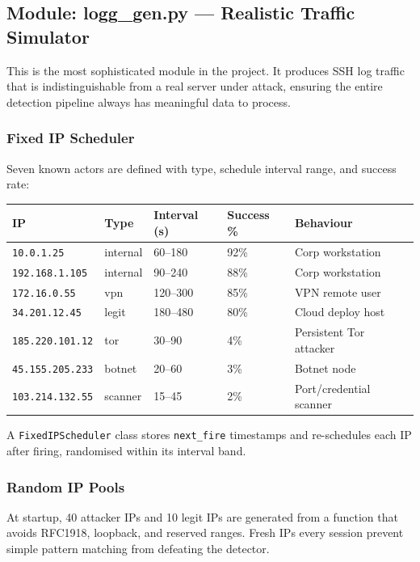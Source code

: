 \documentclass[12pt,a4paper]{article}
\begin{document}
\subsection{Module: logg\_gen.py — Realistic Traffic Simulator}

This is the most sophisticated module in the project. It produces SSH log
traffic that is indistinguishable from a real server under attack, ensuring
the entire detection pipeline always has meaningful data to process.

\subsubsection*{Fixed IP Scheduler}
Seven known actors are defined with type, schedule interval range, and
success rate:

\begin{center}
\begin{tabular}{p{3.2cm}p{1.8cm}p{2.8cm}p{2cm}p{3cm}}
  \toprule
  \textbf{IP} & \textbf{Type} & \textbf{Interval (s)} & \textbf{Success \%} & \textbf{Behaviour} \\
  \midrule
  \texttt{10.0.1.25}       & internal & 60--180   & 92\% & Corp workstation \\
  \texttt{192.168.1.105}   & internal & 90--240   & 88\% & Corp workstation \\
  \texttt{172.16.0.55}     & vpn      & 120--300  & 85\% & VPN remote user \\
  \texttt{34.201.12.45}    & legit    & 180--480  & 80\% & Cloud deploy host \\
  \texttt{185.220.101.12}  & tor      & 30--90    & 4\%  & Persistent Tor attacker \\
  \texttt{45.155.205.233}  & botnet   & 20--60    & 3\%  & Botnet node \\
  \texttt{103.214.132.55}  & scanner  & 15--45    & 2\%  & Port/credential scanner \\
  \bottomrule
\end{tabular}
\end{center}

A \texttt{FixedIPScheduler} class stores \texttt{next\_fire} timestamps and
re-schedules each IP after firing, randomised within its interval band.

\subsubsection*{Random IP Pools}
At startup, 40 attacker IPs and 10 legit IPs are generated from a function
that avoids RFC1918, loopback, and reserved ranges. Fresh IPs every session
prevent simple pattern matching from defeating the detector.
\end{document}
